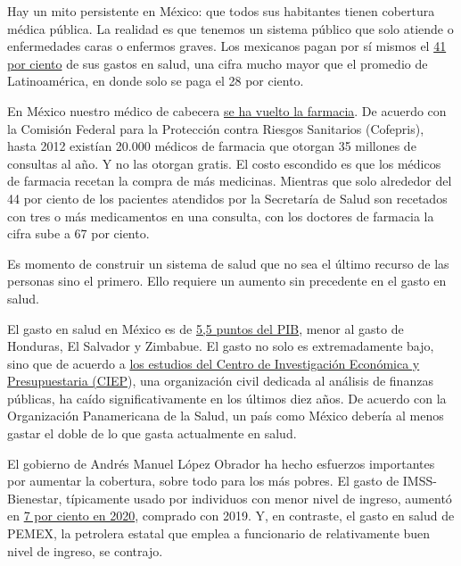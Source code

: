 Hay un mito persistente en México: que todos sus habitantes tienen
cobertura médica pública. La realidad es que tenemos un sistema público
que solo atiende o enfermedades caras o enfermos graves. Los mexicanos
pagan por sí mismos el
\href{https://data.worldbank.org/indicator/SH.XPD.OOPC.CH.ZS?locations=MX-ZJ}{41
por ciento} de sus gastos en salud, una cifra mucho mayor que el
promedio de Latinoamérica, en donde solo se paga el 28 por ciento.

En México nuestro médico de cabecera
\href{https://www.sciencedirect.com/science/article/pii/S2212109917300687\#bib1}{se
ha vuelto la farmacia}. De acuerdo con la Comisión Federal para la
Protección contra Riesgos Sanitarios (Cofepris), hasta 2012 existían
20.000 médicos de farmacia que otorgan 35 millones de consultas al año.
Y no las otorgan gratis. El costo escondido es que los médicos de
farmacia recetan la compra de más medicinas. Mientras que solo alrededor
del 44 por ciento de los pacientes atendidos por la Secretaría de Salud
son recetados con tres o más medicamentos en una consulta, con los
doctores de farmacia la cifra sube a 67 por ciento.

Es momento de construir un sistema de salud que no sea el último recurso
de las personas sino el primero. Ello requiere un aumento sin precedente
en el gasto en salud.

El gasto en salud en México es de
\href{https://data.worldbank.org/indicator/SH.XPD.CHEX.GD.ZS?locations=MX-HN-SV-ZW}{5,5
puntos del PIB}, menor al gasto de Honduras, El Salvador y Zimbabue. El
gasto no solo es extremadamente bajo, sino que de acuerdo a
\href{https://ciep.mx/la-contraccion-del-gasto-per-capita-en-salud-2010-2020/}{los
estudios del Centro de Investigación Económica y Presupuestaria (CIEP}),
una organización civil dedicada al análisis de finanzas públicas, ha
caído significativamente en los últimos diez años. De acuerdo con la
Organización Panamericana de la Salud, un país como México debería al
menos gastar el doble de lo que gasta actualmente en salud.

El gobierno de Andrés Manuel López Obrador ha hecho esfuerzos
importantes por aumentar la cobertura, sobre todo para los más pobres.
El gasto de IMSS-Bienestar, típicamente usado por individuos con menor
nivel de ingreso, aumentó en
\href{https://ciep.mx/la-contraccion-del-gasto-per-capita-en-salud-2010-2020/}{7
por ciento en 2020}, comprado con 2019. Y, en contraste, el gasto en
salud de PEMEX, la petrolera estatal que emplea a funcionario de
relativamente buen nivel de ingreso, se contrajo.

